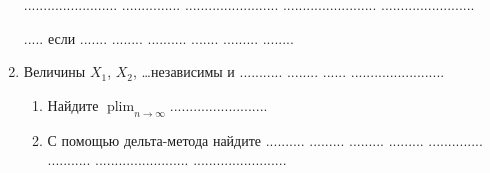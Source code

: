 \documentclass[10pt,a4paper]{article}
\DeclareMathOperator*\plim{plim}
\begin{document}
\begin{enumerate}
........................ ............... ........................ ........................ ........................

..... если ....... ........ .......... ....... ......... ........

\item Величины $X_1$, $X_2$, \ldots независимы и ........... ........ ...... ........................
\begin{enumerate}
\item Найдите $\plim_{n\to\infty} .........................$ 
\item С помощью дельта-метода найдите .......... ......... ......... ......... .............. ........... ........................ ........................
\end{enumerate}

\end{enumerate}
\end{document}
